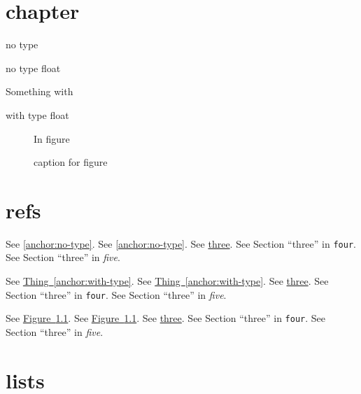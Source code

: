 \documentclass{book}
\begin{document}
\label{anchor:Top}%
\chapter{{chapter}}
\label{anchor:chapter}%

\begin{TexinfoFloat}
no type
\caption[short no type float]{no type float}


\label{anchor:no-type}%
\end{TexinfoFloat}

\begin{TexinfoFloatThing}
Something with
\caption[short with type float]{with type float}


\label{anchor:with-type}%
\end{TexinfoFloatThing}

\begin{figure}
In figure
\caption[short caption for figure]{caption for figure}


\label{anchor:my-figure}%
\end{figure}

\chapter{{refs}}

See \hyperref[anchor:no-type]{\ref*{anchor:no-type}}.
See \hyperref[anchor:no-type]{\ref*{anchor:no-type}}.
See \hyperref[anchor:no-type]{three}.
See Section ``three'' in \texttt{four}.
See Section ``three'' in \textsl{five}.

See \hyperref[anchor:with-type]{Thing~\ref*{anchor:with-type}}.
See \hyperref[anchor:with-type]{Thing~\ref*{anchor:with-type}}.
See \hyperref[anchor:with-type]{three}.
See Section ``three'' in \texttt{four}.
See Section ``three'' in \textsl{five}.

See \hyperref[anchor:my-figure]{Figure~\ref*{anchor:my-figure}}.
See \hyperref[anchor:my-figure]{Figure~\ref*{anchor:my-figure}}.
See \hyperref[anchor:my-figure]{three}.
See Section ``three'' in \texttt{four}.
See Section ``three'' in \textsl{five}.

\chapter{{lists}}

\listoffigures
{}
\end{document}
